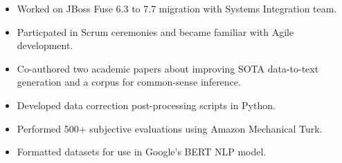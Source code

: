 \documentclass[10pt,a4paper,ragged2e]{altacv}
\begin{document}


\begin{fullwidth}
\makecvheader
\end{fullwidth}



\begin{itemize}
\item Worked on JBoss Fuse 6.3 to 7.7 migration with Systems Integration team.
\item Particpated in Scrum ceremonies and became familiar with Agile development.
\end{itemize}

\divider

\begin{itemize}
\item Co-authored two academic papers about improving SOTA data-to-text generation and a corpus for common-sense inference.
\item Developed data correction post-processing scripts in Python.
\item Performed 500+ subjective evaluations using Amazon Mechanical Turk.
\item Formatted datasets for use in Google's BERT NLP model.
\end{itemize}

\divider
\end{document}
